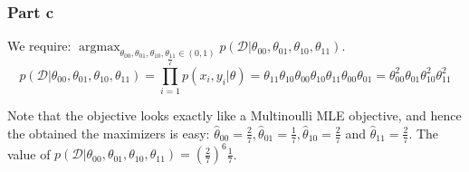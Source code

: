 \documentclass{article}
\newcommand{\argmax}{\mathop{\mathrm{argmax}}}
\begin{document}
\subsubsection*{Part c}
\begin{flushleft}
We require: \(\displaystyle \argmax_{\theta_{00}, \theta_{01}, \theta_{10}, \theta_{11} \in (0, 1)} p(\mathcal{D} | \theta_{00}, \theta_{01}, \theta_{10}, \theta_{11}) \).
\begin{equation}
p(\mathcal{D} | \theta_{00}, \theta_{01}, \theta_{10}, \theta_{11}) = \prod_{i=1}^{7} p(x_{i}, y_{i} | \theta) = \theta_{11}\theta_{10}\theta_{00}\theta_{10}\theta_{11}\theta_{00}\theta_{01} = \theta_{00}^{2}\theta_{01}\theta_{10}^{2}\theta_{11}^{2}
\end{equation}

Note that the objective looks exactly like a Multinoulli MLE objective, and hence the obtained the maximizers is easy: \(\hat{\theta}_{00} = \frac{2}{7}, \hat{\theta}_{01} = \frac{1}{7}, \hat{\theta}_{10} = \frac{2}{7}\) and \(\hat{\theta}_{11} = \frac{2}{7}\). The value of \(p(\mathcal{D} | \theta_{00}, \theta_{01}, \theta_{10}, \theta_{11}) = \left(\frac{2}{7}\right)^{6}\frac{1}{7}\).
\end{flushleft}
\end{document}
